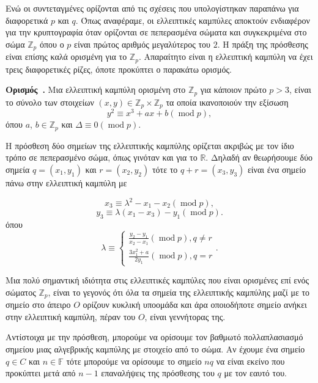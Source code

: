 \documentclass[12pt, a4paper]{book}
\newcounter{definition}[section]
\newenvironment{definition}[1][]{\refstepcounter{definition}\par\medskip
   \textbf{Ορισμός~\thedefinition. #1} \rmfamily}{\medskip}
\DeclareMathOperator{\Mod}{  mod}
\begin{document}
Ενώ οι συντεταγμένες ορίζονται από τις σχέσεις που υπολογίστηκαν παραπάνω για διαφορετικά $p$ και $q$.
Όπως αναφέραμε, οι ελλειπτικές καμπύλες αποκτούν ενδιαφέρον για την κρυπτογραφία όταν ορίζονται σε πεπερασμένα σώματα και συγκεκριμένα στο σώμα $\mathbb{Z}_p$ όπου ο $p$ είναι πρώτος αριθμός μεγαλύτερος του $2$. Η πράξη της πρόσθεσης είναι επίσης καλά ορισμένη για το $\mathbb{Z}_p$. Απαραίτητο είναι η ελλειπτική καμπύλη να έχει τρεις διαφορετικές ρίζες, όποτε προκύπτει ο παρακάτω ορισμός.

\begin{definition}
Μια ελλειπτική καμπύλη ορισμένη στο $\mathbb{Z}_p$ για κάποιον πρώτο $p>3$, είναι το σύνολο των στοιχείων $(x,y) \in \mathbb{Z}_p \times \mathbb{Z}_p$ τα οποία ικανοποιούν την εξίσωση
\begin{displaymath}
y^2 \equiv x^3+ax+b   (\Mod{p}),
\end{displaymath}
όπου $a$, $b \in  \mathbb{Z}_p$ και $Δ \equiv 0 (\Mod{p})$.
\end{definition}

Η πρόσθεση δύο σημείων της ελλειπτικής καμπύλης ορίζεται ακριβώς με τον ίδιο τρόπο σε πεπερασμένο σώμα, όπως γινόταν και για το $\mathbb{R}$. Δηλαδή αν θεωρήσουμε δύο σημεία $q = (x_1,y_1)$ και $r=(x_2,y_2)$ τότε το $q+r=(x_3,y_3)$ είναι ένα σημείο πάνω στην ελλειπτική καμπύλη με

\begin{displaymath}
x_3\equiv λ^2-x_1-x_2 (\Mod{p}),
\end{displaymath}
\begin{displaymath}
y_3\equiv λ(x_1-x_3)-y_1 (\Mod{p}).
\end{displaymath}
όπου
\begin{displaymath}
λ\equiv \begin{cases} \frac{y_2-y_1}{x_2-x_1} (\Mod{p}), q\neq r \\ \frac{3x_1^2+a}{2y_1} (\Mod{p}), q=r \end{cases}.
\end{displaymath}

Μια πολύ σημαντική ιδιότητα στις ελλειπτικές καμπύλες που είναι ορισμένες επί ενός σώματος $\mathbb{Z}_p$, είναι το γεγονός ότι όλα τα σημεία της ελλειπτικής καμπύλης μαζί με το σημείο στο άπειρο $O$ ορίζουν κυκλική υποομάδα και άρα οποιοδήποτε σημείο ανήκει στην ελλειπτική καμπύλη, πέραν του $Ο$, είναι γεννήτορας της.

Αντίστοιχα με την πρόσθεση, μπορούμε να ορίσουμε τον βαθμωτό πολλαπλασιασμό σημείου μιας αλγεβρικής καμπύλης με στοιχείο από το σώμα. Αν έχουμε ένα σημείο $q \in C$ και $n \in \mathbb{F}$ τότε μπορούμε να ορίσουμε το σημείο $nq$ να είναι εκείνο που προκύπτει μετά από $n-1$ επαναλήψεις της πρόσθεσης του $q$ με τον εαυτό του.
\end{document}
